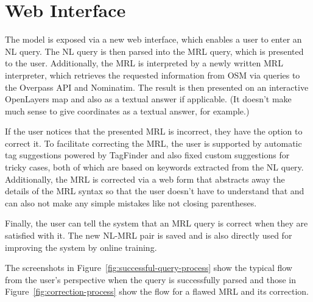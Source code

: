\chapter{Web Interface}
\label{ch:web-interface}

The model is exposed via a new web interface, which enables a user to enter an
NL query. The NL query is then parsed into the MRL query, which is presented to
the user. Additionally, the MRL is interpreted by a newly written MRL
interpreter, which retrieves the requested information from OSM via queries to
the Overpass API and Nominatim. The result is then presented on an interactive
OpenLayers map and also as a textual answer if
applicable. (It doesn’t make much sense to give coordinates as a textual answer,
for example.)

If the user notices that the presented MRL is incorrect, they have the option to
correct it. To facilitate correcting the MRL, the user is supported by automatic
tag suggestions powered by TagFinder
\parencite{gwerder-2014} and also fixed custom suggestions for tricky cases,
both of which are based on keywords extracted from the NL query. Additionally,
the MRL is corrected via a web form that abstracts away the details of the MRL
syntax so that the user doesn’t have to understand that and can also not make
any simple mistakes like not closing parentheses.

Finally, the user can tell the system that an MRL query is correct when they are
satisfied with it. The new NL-MRL pair is saved and is also directly used for
improving the system by online training.

The screenshots in Figure~\ref{fig:successful-query-process} show the typical
flow from the user’s perspective when the query is successfully parsed and those
in Figure~\ref{fig:correction-process} show the flow for a flawed MRL and its
correction.

